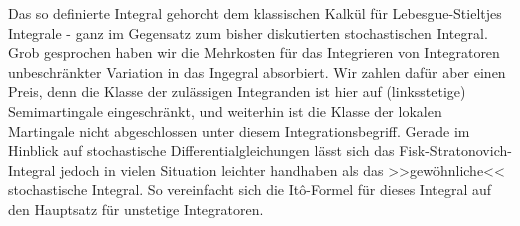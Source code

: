 Das so definierte Integral gehorcht dem klassischen Kalkül für
Lebesgue-Stieltjes Integrale - ganz im Gegensatz zum bisher diskutierten
stochastischen Integral. Grob gesprochen haben wir die Mehrkosten für das
Integrieren von Integratoren unbeschränkter Variation in das Ingegral
absorbiert. Wir zahlen dafür aber einen Preis, denn die Klasse der zulässigen Integranden ist hier auf (linksstetige) Semimartingale eingeschränkt, und weiterhin ist die Klasse der lokalen Martingale nicht
abgeschlossen unter diesem Integrationsbegriff. Gerade im Hinblick auf
stochastische Differentialgleichungen lässt sich das Fisk-Stratonovich-Integral
jedoch in vielen Situation leichter handhaben als das >>gewöhnliche<<
stochastische Integral. So vereinfacht sich die Itô-Formel für dieses Integral
auf den Hauptsatz für unstetige Integratoren.


